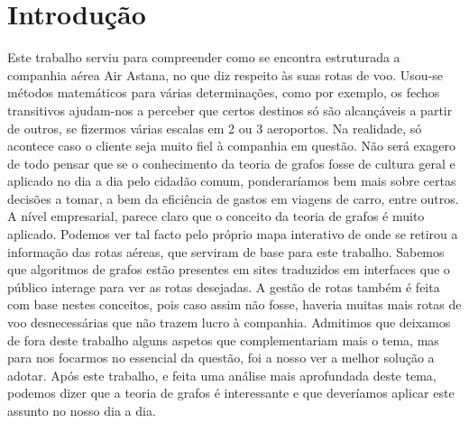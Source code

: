\chapter{Introdução}
Este trabalho serviu para compreender como se encontra estruturada a companhia aérea Air Astana, no 
que diz respeito às suas rotas de voo. Usou-se métodos matemáticos para várias determinações, como por 
exemplo, os fechos transitivos ajudam-nos a perceber que certos destinos só são alcançáveis a partir de outros, se 
fizermos várias escalas em 2 ou 3 aeroportos. Na realidade, só acontece caso o cliente seja muito fiel à companhia 
em questão.
Não será exagero de todo pensar que se o conhecimento da teoria de grafos fosse de cultura geral e 
aplicado no dia a dia pelo cidadão comum, ponderaríamos bem mais sobre certas decisões a tomar, a bem da 
eficiência de gastos em viagens de carro, entre outros.
A nível empresarial, parece claro que o conceito da teoria de grafos é muito aplicado. Podemos ver tal 
facto pelo próprio mapa interativo de onde se retirou a informação das rotas aéreas, que serviram de base para 
este trabalho. Sabemos que algoritmos de grafos estão presentes em sites traduzidos em interfaces que o público 
interage para ver as rotas desejadas. A gestão de rotas também é feita com base nestes conceitos, pois caso 
assim não fosse, haveria muitas mais rotas de voo desnecessárias que não trazem lucro à companhia.
Admitimos que deixamos de fora deste trabalho alguns aspetos que complementariam mais o tema, mas 
para nos focarmos no essencial da questão, foi a nosso ver a melhor solução a adotar.
Após este trabalho, e feita uma análise mais aprofundada deste tema, podemos dizer que a teoria de 
grafos é interessante e que deveríamos aplicar este assunto no nosso dia a dia.

        